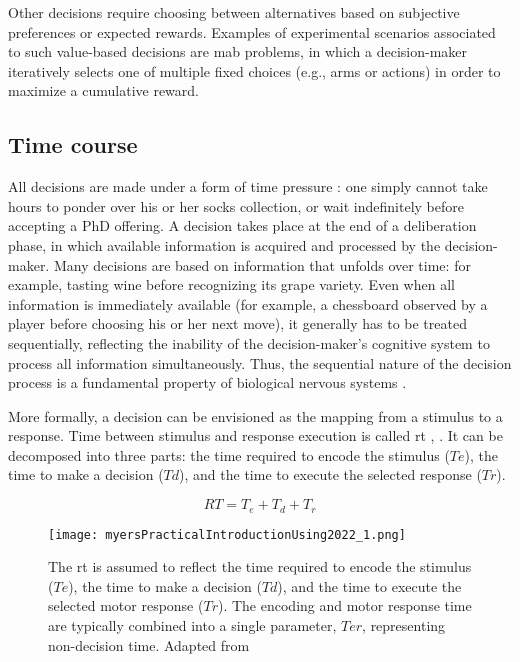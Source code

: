 Other decisions require choosing between alternatives based on subjective preferences or expected rewards. Examples of experimental scenarios associated to such value-based decisions are \acrlong{mab} problems, in which a decision-maker iteratively selects one of multiple fixed choices (e.g., arms or actions) in order to maximize a cumulative reward.

\subsection{Time course}

All decisions are made under a form of time pressure \cite{forstmannSequentialSamplingModels2016}: one simply cannot take hours to ponder over his or her socks collection, or wait indefinitely before accepting a PhD offering. A decision takes place at the end of a deliberation phase, in which available information is acquired and processed by the decision-maker. Many decisions are based on information that unfolds over time: for example, tasting wine before recognizing its grape variety. Even when all information is immediately available (for example, a chessboard observed by a player before choosing his or her next move), it generally has to be treated sequentially, reflecting the inability of the decision-maker's cognitive system to process all information simultaneously. Thus, the sequential nature of the decision process is a fundamental property of biological nervous systems \cite{forstmannSequentialSamplingModels2016}.

More formally, a decision can be envisioned as the mapping from a stimulus to a response. Time between stimulus and response execution is called \acrfull{rt} \cite{forstmannSequentialSamplingModels2016}, \cite{myersPracticalIntroductionUsing2022}. It can be decomposed into three parts: the time required to encode the stimulus ($Te$), the time to make a decision ($Td$), and the time to execute the selected response ($Tr$).

$$RT = T_e+T_d+T_r$$

\begin{figure}[ht]
    \centering
    \texttt{[image: myersPracticalIntroductionUsing2022\_1.png]}
    \caption[Decomposition of \acrlong{rt} for a decision]{The \acrfull{rt} is assumed to reflect the time required to encode the stimulus ($Te$), the time to make a decision ($Td$), and the time to execute the selected motor response ($Tr$). The encoding and motor response time are typically combined into a single parameter, $Ter$, representing non-decision time. Adapted from \cite{myersPracticalIntroductionUsing2022}}
\end{figure}


